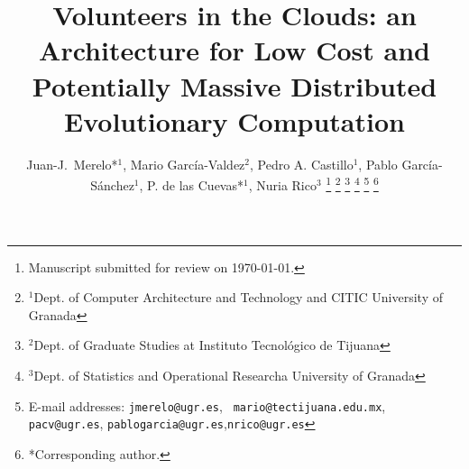 \documentclass[journal,onecolumn]{IEEEtran}
\begin{document}
\title{Volunteers in the Clouds: an Architecture for Low Cost and
  Potentially Massive Distributed Evolutionary Computation}



\author{Juan-J.~Merelo*$^1$, Mario Garc\'ia-Valdez$^2$, Pedro A. Castillo$^1$, Pablo Garc\'ia-S\'anchez$^1$, P. de las Cuevas*$^1$, Nuria Rico$^3$
\thanks{Manuscript submitted for review on \today.}%
\thanks{$^1$Dept. of Computer Architecture and Technology and CITIC University of Granada}%
\thanks{$^2$Dept. of Graduate Studies at Instituto Tecnol\'ogico de Tijuana}%
\thanks{$^3$Dept. of Statistics and Operational Researcha University of Granada}%
\thanks{E-mail addresses: {\tt jmerelo@ugr.es}, {\tt
    mario@tectijuana.edu.mx}, {\tt pacv@ugr.es}, {\tt pablogarcia@ugr.es},{\tt nrico@ugr.es}}%
\thanks{*Corresponding author.}%
}

\maketitle
\end{document}
